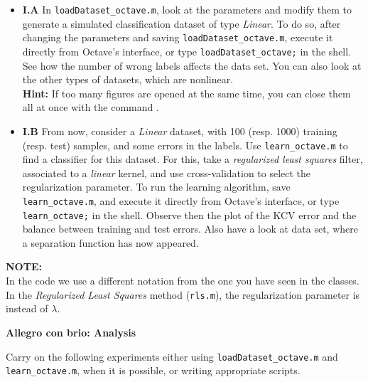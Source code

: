\documentclass[DIN, pagenumber=false, fontsize=11pt, parskip=half]{scrartcl}
\newcommand{\mysection}[1]{\noindent\large\textbf{#1}}
\begin{document}
\begin{itemize}
	\item \textbf{I.A} In \texttt{loadDataset\_octave.m}, look at the parameters and modify them to generate a simulated classification dataset of type \textit{Linear}.
	To do so, after changing the parameters and saving \texttt{loadDataset\_octave.m}, execute it directly from Octave's interface, or type \texttt{loadDataset\_octave;} in the shell.
	See how the number of wrong labels affects the data set.
	You can also look at the other types of datasets, which are nonlinear.\\
	\textbf{Hint:} If too many figures are opened at the same time, you can close them all at once with the command .
	\item \textbf{I.B} From now, consider a \textit{Linear} dataset, with 100 (resp. 1000) training (resp. test) samples, and some errors in the labels.
	Use \texttt{learn\_octave.m} to find a  classifier for this dataset.
	For this, take a \textit{regularized least squares} filter, associated to a \textit{linear} kernel, and use cross-validation to select the regularization parameter.
	To run the learning algorithm, save \texttt{learn\_octave.m}, and execute it directly from Octave's interface, or type \texttt{learn\_octave;} in the shell.
	Observe then the plot of the KCV error and the balance between training and test errors.
	Also have a look at data set, where a separation function has now appeared.
\end{itemize}

\begin{framed}
\textbf{NOTE:} \\
In the code we use a different notation from the one you have seen in the classes. In the \emph{Regularized Least Squares} method (\texttt{rls.m}), the regularization parameter is  instead of $\lambda$.
\end{framed}







\mysection{Allegro con brio: Analysis}

Carry on the following experiments either using \texttt{loadDataset\_octave.m} and \texttt{learn\_octave.m}, when it is possible, or writing appropriate scripts.
\end{document}
